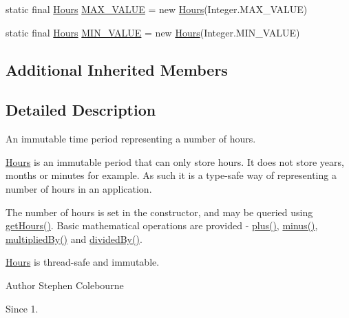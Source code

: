\begin{DoxyCompactItemize}
\item 
static final \hyperlink{classorg_1_1joda_1_1time_1_1_hours}{Hours} \hyperlink{classorg_1_1joda_1_1time_1_1_hours_aa176fe7102f0a157c8bf24dbd9d151a5}{M\-A\-X\-\_\-\-V\-A\-L\-U\-E} = new \hyperlink{classorg_1_1joda_1_1time_1_1_hours}{Hours}(Integer.\-M\-A\-X\-\_\-\-V\-A\-L\-U\-E)
\item 
static final \hyperlink{classorg_1_1joda_1_1time_1_1_hours}{Hours} \hyperlink{classorg_1_1joda_1_1time_1_1_hours_a9565527ae81431323c1ab7bf18e8d11c}{M\-I\-N\-\_\-\-V\-A\-L\-U\-E} = new \hyperlink{classorg_1_1joda_1_1time_1_1_hours}{Hours}(Integer.\-M\-I\-N\-\_\-\-V\-A\-L\-U\-E)
\end{DoxyCompactItemize}
\subsection*{Additional Inherited Members}


\subsection{Detailed Description}
An immutable time period representing a number of hours. 

{\ttfamily \hyperlink{classorg_1_1joda_1_1time_1_1_hours}{Hours}} is an immutable period that can only store hours. It does not store years, months or minutes for example. As such it is a type-\/safe way of representing a number of hours in an application. 

The number of hours is set in the constructor, and may be queried using {\ttfamily \hyperlink{classorg_1_1joda_1_1time_1_1_hours_a53626f2972932447f4e2544f8d8908d0}{get\-Hours()}}. Basic mathematical operations are provided -\/ {\ttfamily \hyperlink{classorg_1_1joda_1_1time_1_1_hours_a3ba90e3f14f9871ffe63c067e43434e0}{plus()}}, {\ttfamily \hyperlink{classorg_1_1joda_1_1time_1_1_hours_a8d4dd87d7a6253f5d18c157f32c21559}{minus()}}, {\ttfamily \hyperlink{classorg_1_1joda_1_1time_1_1_hours_a4b228a04bc268a56f31d8ac9b34309f3}{multiplied\-By()}} and {\ttfamily \hyperlink{classorg_1_1joda_1_1time_1_1_hours_a70499b1782fb6553628c4d5f26459d28}{divided\-By()}}. 

{\ttfamily \hyperlink{classorg_1_1joda_1_1time_1_1_hours}{Hours}} is thread-\/safe and immutable.

\begin{DoxyAuthor}{Author}
Stephen Colebourne 
\end{DoxyAuthor}
\begin{DoxySince}{Since}
1. 
\end{DoxySince}


